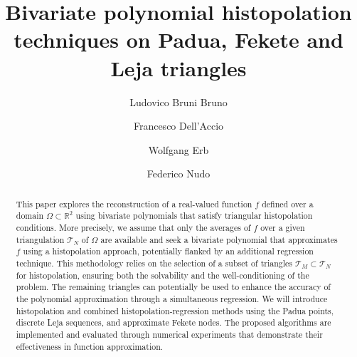 \documentclass{svjour3}
\author{Ludovico Bruni Bruno         \and
        Francesco Dell'Accio \and 
        Wolfgang Erb \and 
        Federico Nudo
}
\institute{Ludovico Bruni Bruno \at
              Department of Mathematics \enquote{Tullio Levi-Civita}, University of Padova, Italy \\
              Istituto Nazionale di Alta Matematica, Roma, Italy
              \email{ludovico.brunibruno@unipd.it}         
           \and
            Francesco Dell'Accio \at
             Department of Mathematics and Computer Science, University of Calabria, Rende (CS), Italy\\ 
             Istituto per le Applicazioni del Calcolo 'Mauro Picone', Naples Branch, C.N.R. National Research Council of Italy, Napoli, Italy
             \email{francesco.dellaccio@unical.it} 
         \and 
             Wolfgang Erb \at
              Department of Mathematics \enquote{Tullio Levi-Civita}, University of Padova, Italy \\
              \email{wolfgang.erb@unipd.it}
         \and 
            Federico Nudo \at
              Department of Mathematics \enquote{Tullio Levi-Civita}, University of Padova, Italy \\
              \email{federico.nudo@unipd.it}
}
\begin{document}


\title{Bivariate polynomial histopolation techniques on Padua, Fekete and Leja triangles}








\date{}

\maketitle


\begin{abstract}
This paper explores the reconstruction of a real-valued function $f$ defined over a domain $\Omega \subset \mathbb{R}^2$ using bivariate polynomials that satisfy triangular histopolation conditions. More precisely, we assume that only the averages of $f$ over a given triangulation $\mathcal{T}_N$ of $\Omega$ are available and seek a bivariate polynomial that approximates $f$ using a histopolation approach, potentially flanked by an additional regression technique. This methodology relies on the selection of a subset of triangles $\mathcal{T}_M \subset \mathcal{T}_N$ for histopolation, ensuring both the solvability and the well-conditioning of the problem. The remaining triangles can potentially be used to enhance the accuracy of the polynomial approximation through a simultaneous regression. We will introduce histopolation and combined histopolation-regression methods using the Padua points, discrete Leja sequences, and approximate Fekete nodes. The proposed algorithms are implemented and evaluated through numerical experiments that demonstrate their effectiveness in function approximation.
\end{abstract}
\end{document}
